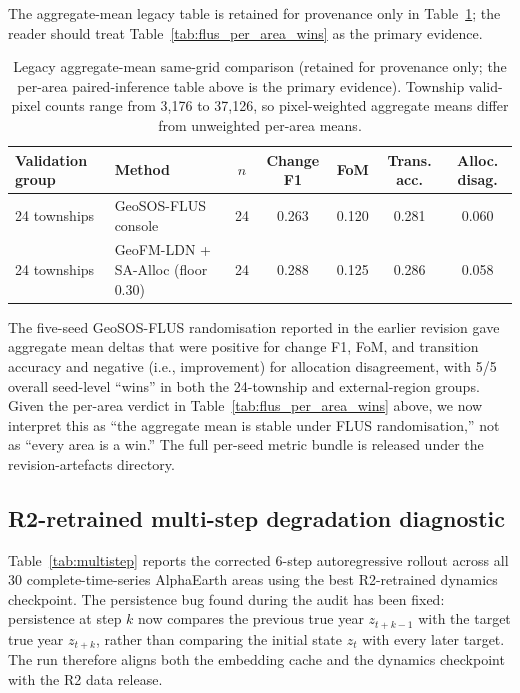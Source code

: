 \documentclass{article}
\begin{document}
The aggregate-mean legacy table is retained for provenance only in Table~\ref{tab:geosos_flus_same_grid_legacy}; the reader should treat Table~\ref{tab:flus_per_area_wins} as the primary evidence.

\begin{table}[htbp]
\centering
\caption{Legacy aggregate-mean same-grid comparison (retained for provenance only; the per-area paired-inference table above is the primary evidence). Township valid-pixel counts range from 3{,}176 to 37{,}126, so pixel-weighted aggregate means differ from unweighted per-area means.}
\label{tab:geosos_flus_same_grid_legacy}
\footnotesize
\begin{tabular*}{\textwidth}{@{\extracolsep{\fill}}llccccc@{}}
\toprule
Validation group & Method & $n$ & Change F1 & FoM & Trans. acc. & Alloc. disag. \\
\midrule
24 townships & GeoSOS-FLUS console                    & 24 & 0.263 & 0.120 & 0.281 & 0.060 \\
24 townships & GeoFM-LDN + SA-Alloc (floor 0.30)     & 24 & 0.288 & 0.125 & 0.286 & 0.058 \\
\bottomrule
\end{tabular*}
\end{table}

The five-seed GeoSOS-FLUS randomisation reported in the earlier revision gave aggregate mean deltas that were positive for change F1, FoM, and transition accuracy and negative (i.e., improvement) for allocation disagreement, with 5/5 overall seed-level ``wins'' in both the 24-township and external-region groups. Given the per-area verdict in Table~\ref{tab:flus_per_area_wins} above, we now interpret this as ``the aggregate mean is stable under FLUS randomisation,'' not as ``every area is a win.'' The full per-seed metric bundle is released under the revision-artefacts directory.

\subsection{R2-retrained multi-step degradation diagnostic}

Table~\ref{tab:multistep} reports the corrected 6-step autoregressive rollout across all 30 complete-time-series AlphaEarth areas using the best R2-retrained dynamics checkpoint. The persistence bug found during the audit has been fixed: persistence at step $k$ now compares the previous true year $z_{t+k-1}$ with the target true year $z_{t+k}$, rather than comparing the initial state $z_t$ with every later target. The run therefore aligns both the embedding cache and the dynamics checkpoint with the R2 data release.
\end{document}

